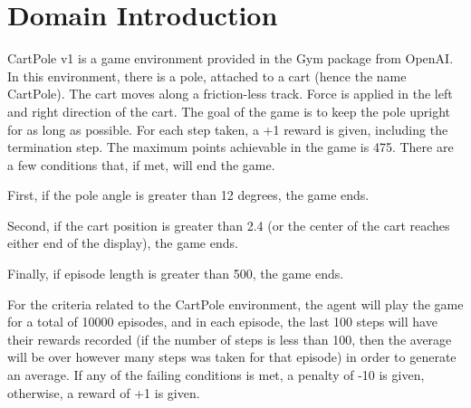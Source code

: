 \section{Domain Introduction}

CartPole v1 is a game environment provided in the Gym package from OpenAI. In this environment, there is a pole, attached to a cart (hence the name CartPole). The cart moves along a friction-less track. Force is applied in the left and right direction of the cart.
The goal of the game is to keep the pole upright for as long as possible. For each step taken, a +1 reward is given, including the termination step. The maximum points achievable in the game is 475. There are a few conditions that, if met, will end the game.

First, if the pole angle is greater than 12 degrees, the game ends.

Second, if the cart position is greater than 2.4 (or the center of the cart reaches either end of the display), the game ends.

Finally, if episode length is greater than 500, the game ends.

For the criteria related to the CartPole environment, the agent will play the game for a total of 10000 episodes, and in each episode, the last 100 steps will have their rewards recorded (if the number of steps is less than 100, then the average will be over however many steps was taken for that episode) in order to generate an average.
If any of the failing conditions is met, a penalty of -10 is given, otherwise, a reward of +1 is given.